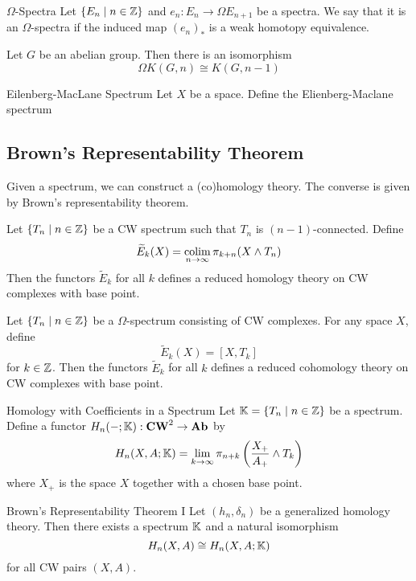 \documentclass[a4paper]{article}
\begin{document}
\begin{defn}{$\Omega$-Spectra}{} Let $\{E_n\;|\;n\in\mathbb{Z}\}$ and $e_n:E_n\to\Omega E_{n+1}$ be a spectra. We say that it is an $\Omega$-spectra if the induced map $(e_n)_\ast$ is a weak homotopy equivalence. 
\end{defn}

\begin{prp}{}{} Let $G$ be an abelian group. Then there is an isomorphism $$\Omega K(G,n)\cong K(G,n-1)$$
\end{prp}

\begin{defn}{Eilenberg-MacLane Spectrum}{} Let $X$ be a space. Define the Elienberg-Maclane spectrum
\end{defn}

\subsection{Brown's Representability Theorem}
Given a spectrum, we can construct a (co)homology theory. The converse is given by Brown's representability theorem. 

\begin{thm}{}{} Let $\{T_n\;|\;n\in\mathbb{Z}\}$ be a CW spectrum such that $T_n$ is $(n-1)$-connected. Define $$\widetilde{E}_k(X)=\operatorname*{colim}_{n\to\infty}\pi_{k+n}(X\wedge T_n)$$ Then the functors $\widetilde{E}_k$ for all $k$ defines a reduced homology theory on CW complexes with base point. 
\end{thm}

\begin{thm}{}{} Let $\{T_n\;|\;n\in\mathbb{Z}\}$ be a $\Omega$-spectrum consisting of CW complexes. For any space $X$, define $$\widetilde{E}_k(X)=[X,T_k]$$ for $k\in\mathbb{Z}$. Then the functors $\widetilde{E}_k$ for all $k$ defines a reduced cohomology theory on CW complexes with base point. 
\end{thm}

\begin{defn}{Homology with Coefficients in a Spectrum}{} Let $\mathbb{K}=\{T_n\;|\;n\in\mathbb{Z}\}$ be a spectrum. Define a functor $H_n(-;\mathbb{K}):\bold{CW}^2\to\bold{Ab}$ by $$H_n(X,A;\mathbb{K})=\lim_{k\to\infty}\pi_{n+k}\left(\frac{X_+}{A_+}\wedge T_k\right)$$ where $X_+$ is the space $X$ together with a chosen base point. 
\end{defn}

\begin{thm}{Brown's Representability Theorem I}{} Let $(h_n,\delta_n)$ be a generalized homology theory. Then there exists a spectrum $\mathbb{K}$ and a natural isomorphism $$H_n(X,A)\cong H_n(X,A;\mathbb{K})$$ for all CW pairs $(X,A)$. 
\end{thm}
\end{document}
